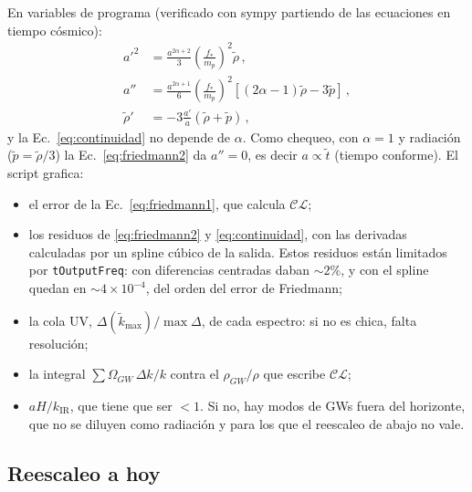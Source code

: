 \documentclass[11pt]{article}
\newcommand{\CosmoLattice}{\ensuremath{\mathcal{C}}\text{osmo}\ensuremath{\mathcal{L}}\text{attice}\xspace}
\begin{document}
            En variables de programa (verificado con sympy partiendo de las ecuaciones en tiempo cósmico):
            \begin{align}
                a'^2 &= \frac{a^{2\alpha+2}}{3} \left( \frac{f_*}{m_p} \right)^2 \tilde\rho \, , \label{eq:friedmann1}\\
                a'' &= \frac{a^{2\alpha+1}}{6} \left( \frac{f_*}{m_p} \right)^2 \left[ (2\alpha - 1) \tilde\rho - 3\tilde p \right] \, , \label{eq:friedmann2}\\
                \tilde\rho' &= -3 \frac{a'}{a} \left( \tilde\rho + \tilde p \right) \, , \label{eq:continuidad}
            \end{align}
            y la Ec.~\eqref{eq:continuidad} no depende de $\alpha$. Como chequeo, con $\alpha = 1$ y radiación ($\tilde p = \tilde\rho/3$) la Ec.~\eqref{eq:friedmann2} da $a'' = 0$, es decir $a \propto \tilde t$ (tiempo conforme). El script grafica:
            \begin{itemize}
                \item el error de la Ec.~\eqref{eq:friedmann1}, que calcula \CosmoLattice;
                \item los residuos de \eqref{eq:friedmann2} y \eqref{eq:continuidad}, con las derivadas calculadas por un spline cúbico de la salida. Estos residuos están limitados por \texttt{tOutputFreq}: con diferencias centradas daban $\sim 2\%$, y con el spline quedan en $\sim 4 \times 10^{-4}$, del orden del error de Friedmann;
                \item la cola UV, $\Delta(\tilde k_{\max})/\max\Delta$, de cada espectro: si no es chica, falta resolución;
                \item la integral $\sum \Omega_{GW} \, \Delta k/k$ contra el $\rho_{GW}/\rho$ que escribe \CosmoLattice;
                \item $aH/k_{\text{IR}}$, que tiene que ser $< 1$. Si no, hay modos de GWs fuera del horizonte, que no se diluyen como radiación y para los que el reescaleo de abajo no vale.
            \end{itemize}

        \subsection{Reescaleo a hoy}
            \label{sec:reescaleo}
\end{document}
